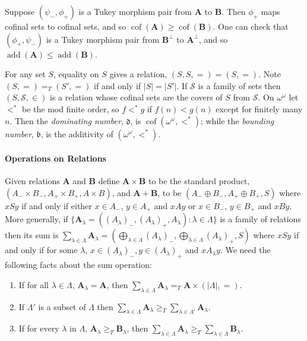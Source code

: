\documentclass{article}
\newcommand{\te}{=_T}
\newcommand{\gtq}{\ge_{T}}
\newcommand{\gte}{=_{T}}
\DeclareMathOperator{\cof}{cof}
\begin{document}
Suppose $(\psi_-,\phi_+)$ is a Tukey morphism pair from $\mathbf{A}$ to $\mathbf{B}$. 
Then $\phi_+$ maps cofinal sets to cofinal sets, and so $\cof(\mathbf{A}) \ge \cof(\mathbf{B})$. 
One can check that $(\phi_+,\psi_-)$ is a Tukey morphism pair from $\mathbf{B}^\perp$ to $\mathbf{A}^\perp$, and so $\mathop{add}(\mathbf{A}) \le \mathop{add}(\mathbf{B})$.

For any set $S$, equality on $S$ gives a relation, $(S,S,=)=(S,=)$. Note $(S,=) \te (S',=)$ if and only if $|S|=|S'|$. 
If $\mathcal{S}$ is a family of sets then $(S,\mathcal{S},\in)$ is a relation whose cofinal sets are the covers of $S$ from $\mathcal{S}$. 
On $\omega^\omega$ let $<^*$ be the mod finite order, so $f<^*g$ if $f(n)<g(n)$ except for finitely many $n$. Then the \emph{dominating number}, $\mathfrak{d}$, is $\cof(\omega^\omega,<^*)$; while the \emph{bounding number}, $\mathfrak{b}$, is the additivity of $(\omega^\omega,<^*)$. 

\paragraph{Operations on Relations}  
Given relations $\mathbf{A}$ and $\mathbf{B}$ define 
$\mathbf{A} \times \mathbf{B}$ to be the standard product, $(A_-\times B_-,A_+\times B_+,A\times B)$, and 
$\mathbf{A} + \mathbf{B}$,  to be $(A_- \oplus B_-,A_+ \oplus B_+,S)$ where $x S y$ if and only if either $x \in A_-$, $y \in A_+$ and $xAy$ or $x\in B_-$, $y\in B_+$ and $xBy$. 
More generally, if $\{\mathbf{A}_\lambda=((A_\lambda)_-,(A_\lambda)_+,A_\lambda) : \lambda \in \Lambda\}$ is a family of relations then its sum is $\sum_{\lambda \in \Lambda} \mathbf{A}_\lambda = (\bigoplus_{\lambda \in \Lambda} (A_\lambda)_-,\bigoplus_{\lambda \in \Lambda} (A_\lambda)_+, S)$ where $x S y$ if and only if for some $\lambda$, $x\in (A_\lambda)_-, y \in (A_\lambda)_+$ and $xA_\lambda y$.
We need the following facts about the sum operation:
\begin{enumerate}[noitemsep,topsep=1pt]
    \item[(A)] If for all $\lambda\in\Lambda$, $\mathbf{A}_\lambda = \mathbf{A}$, then 
    $
    \sum_{\lambda \in \Lambda} \mathbf{A}_\lambda \gte \mathbf{A} \times (|\Lambda|,=)$. 
    \item[(B)]  If  $\Lambda'$ is a subset of $\Lambda$ then 
    $
    \sum_{\lambda \in \Lambda} \mathbf{A}_\lambda \gtq \sum_{\lambda \in \Lambda'} \mathbf{A}_\lambda$. 
    \item[(C)]  If for every $\lambda$ in $\Lambda$,  $\mathbf{A}_\lambda \gtq \mathbf{B}_\lambda$, then 
    $
    \sum_{\lambda \in \Lambda} \mathbf{A}_\lambda \gtq \sum_{\lambda \in \Lambda} \mathbf{B}_\lambda$. 
\end{enumerate}
\end{document}

